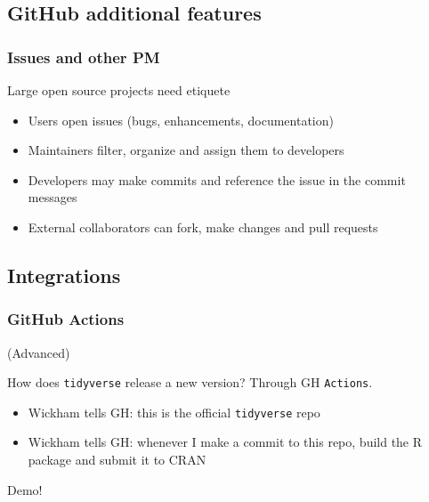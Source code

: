 \documentclass{beamer}
\begin{document}
\subsection{GitHub additional features}

\begin{frame}
    \frametitle{Issues and other PM}
    Large open source projects need etiquete
    \begin{itemize}
        \item Users open issues (bugs, enhancements, documentation)
        \item Maintainers filter, organize and assign them to developers
        \item Developers may make commits and reference the issue in the commit messages
        \item External collaborators can fork, make changes and pull requests
    \end{itemize}
\end{frame}

\subsection{Integrations}

\begin{frame}[fragile]
    \frametitle{GitHub Actions}
    (Advanced)

    How does \verb|tidyverse| release a new version? Through GH \verb|Actions|. 

    \begin{itemize}
        \item Wickham tells GH: this is the official \verb|tidyverse| repo
        \item Wickham tells GH: whenever I make a commit to this repo, build the R package and submit it to CRAN
    \end{itemize}
\end{frame}

\begin{frame}
    Demo!
\end{frame}
\end{document}

